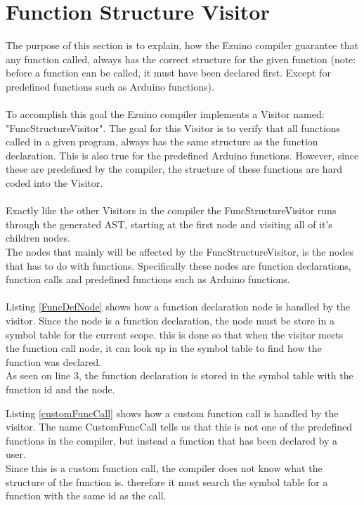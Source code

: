 \section{Function Structure Visitor}
The purpose of this section is to explain, how the Ezuino compiler guarantee that any function called, always has the correct structure for the given function (note: before a function can be called, it must have been declared first. Except for predefined functions such as Arduino functions).
\\\\
To accomplish this goal the Ezuino compiler implements a Visitor named: "FuncStructureVisitor". The goal for this Visitor is to verify that all functions called in a given program, always has the same structure as the function declaration. This is also true for the predefined Arduino functions. However, since these are predefined by the compiler, the structure of these functions are hard coded into the Visitor.
\\\\
Exactly like the other Visitors in the compiler the FuncStructureVisitor runs through the generated AST, starting at the first node and visiting all of it's children nodes.\\
The nodes that mainly will be affected by the FuncStructureVisitor, is the nodes that has to do with functions. Specifically these nodes are function declarations, function calls and predefined functions such as Arduino functions.
\\\\
Listing \ref{FuncDefNode} shows how a function declaration node is handled by the visitor. Since the node is a function declaration, the node must be store in a symbol table for the current scope. this is done so that when the visitor meets the function call node, it can look up in the symbol table to find how the function was declared.\\
As seen on line 3, the function declaration is stored in the symbol table with the function id and the node.

\noindent\newline
Listing \ref{customFuncCall} shows how a custom function call is handled by the visitor. The name CustomFuncCall tells us that this is not one of the predefined functions in the compiler, but instead a function that has been declared by a user.\\
Since this is a custom function call, the compiler does not know what the structure of the function is. therefore it must search the symbol table for a function with the same id as the call.\\
